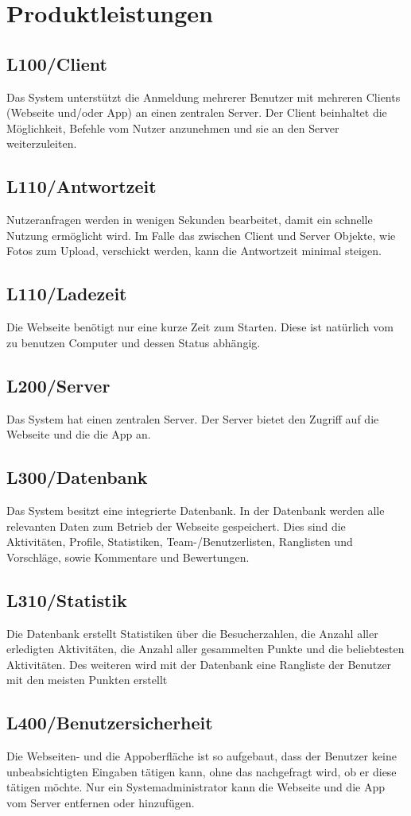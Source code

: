 \section{Produktleistungen}

\subsection{L100/Client} 
Das System unterstützt die Anmeldung mehrerer Benutzer mit mehreren Clients (Webseite und/oder App) an einen zentralen Server. Der Client beinhaltet die Möglichkeit, Befehle vom Nutzer anzunehmen und sie an den Server weiterzuleiten. 

\subsection{L110/Antwortzeit} 
Nutzeranfragen werden in wenigen Sekunden bearbeitet, damit ein schnelle Nutzung ermöglicht wird. Im Falle das zwischen Client und Server Objekte, wie Fotos zum Upload, verschickt werden, kann die Antwortzeit minimal steigen. 

\subsection{L110/Ladezeit} 
Die Webseite benötigt nur eine kurze Zeit zum Starten. Diese ist natürlich vom zu benutzen Computer und dessen Status abhängig. 

\subsection{L200/Server} 
Das System hat einen zentralen Server. Der Server bietet den Zugriff auf die Webseite und die die App an. 

\subsection{L300/Datenbank} 
Das System besitzt eine integrierte Datenbank. In der Datenbank werden alle relevanten Daten zum Betrieb der Webseite gespeichert. Dies sind die Aktivitäten, Profile, Statistiken, Team-/Benutzerlisten, Ranglisten und Vorschläge, sowie Kommentare und Bewertungen.

\subsection{L310/Statistik} 
Die Datenbank erstellt Statistiken über die Besucherzahlen, die Anzahl aller erledigten Aktivitäten, die Anzahl aller gesammelten Punkte und die beliebtesten Aktivitäten. Des weiteren wird mit der Datenbank eine Rangliste der Benutzer mit den meisten Punkten erstellt 


\subsection{L400/Benutzersicherheit} 
Die Webseiten- und die Appoberfläche ist so aufgebaut, dass der Benutzer keine unbeabsichtigten Eingaben tätigen kann, ohne das nachgefragt wird, ob er diese tätigen möchte. Nur ein Systemadministrator kann die Webseite und die App vom Server entfernen oder hinzufügen.
